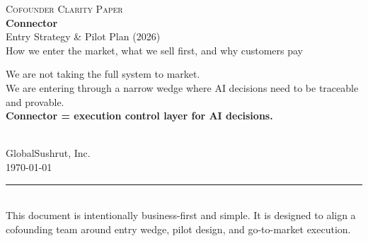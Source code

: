 \documentclass[11pt,a4paper,openany]{book}
\begin{document}
\begin{titlepage}
\pagecolor{MidnightBlue}
\color{white}
\vspace*{2.1cm}
\begin{center}
  {\fontsize{11}{13}\selectfont\scshape\color{white!70} Cofounder Clarity Paper}\\[1.2cm]
  {\fontsize{34}{40}\selectfont\bfseries Connector}\\[0.25cm]
  {\fontsize{20}{24}\selectfont\color{white!88} Entry Strategy \& Pilot Plan (2026)}\\[1.6cm]
  {\Large\color{white!82} How we enter the market, what we sell first, and why customers pay}\\[2.2cm]
  \begin{minipage}{0.82\textwidth}
  \centering
  \setlength{\fboxsep}{12pt}
  \colorbox{white!10}{
    \parbox{0.9\textwidth}{
      \centering
      \large
      We are not taking the full system to market.\\[6pt]
      We are entering through a narrow wedge where AI decisions need to be traceable and provable.\\[10pt]
      \textbf{Connector = execution control layer for AI decisions.}
    }
  }
  \end{minipage}\\[2.3cm]
  {\large\color{white!78} GlobalSushrut, Inc.}\\[0.3cm]
  {\normalsize\color{white!62} \today}
\end{center}
\vfill
\noindent\color{white!35}\rule{\textwidth}{0.4pt}\\[3pt]
{\footnotesize\color{white!55} This document is intentionally business-first and simple. It is designed to align a cofounding team around entry wedge, pilot design, and go-to-market execution.}
\end{titlepage}
\nopagecolor
\color{black}

\frontmatter
\tableofcontents

\mainmatter










\end{document}
